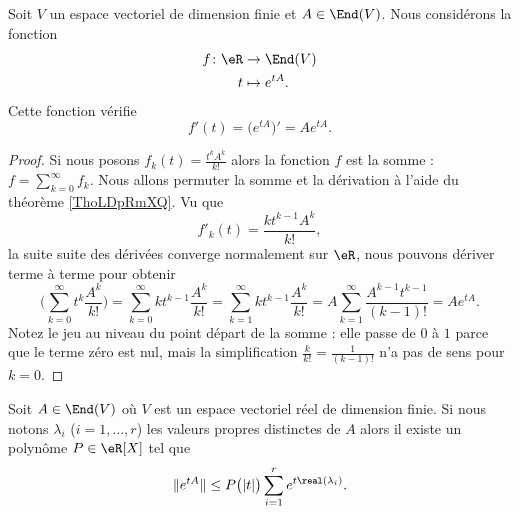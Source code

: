 \begin{proposition}
    Soit \( V\) un espace vectoriel de dimension finie et \( A\in\End(V)\). Nous considérons la fonction
    \begin{equation}
        \begin{aligned}
            f\colon \eR&\to \End(V) \\
            t&\mapsto  e^{tA}. 
        \end{aligned}
    \end{equation}
    Cette fonction vérifie
    \begin{equation}
        f'(t)=\big(  e^{tA} \big)'=A e^{tA}.
    \end{equation}
\end{proposition}

\begin{proof}
    Si nous posons \( f_k(t)=\frac{ t^kA^k }{ k! }\) alors la fonction \( f\) est la somme : \( f=\sum_{k=0}^{\infty}f_k\). Nous allons permuter la somme et la dérivation à l'aide du théorème \ref{ThoLDpRmXQ}. Vu que 
    \begin{equation}
        f'_k(t)=\frac{ kt^{k-1}A^k }{ k! },
    \end{equation}
    la suite suite des dérivées converge normalement sur \( \eR\), nous pouvons dériver terme à terme pour obtenir
    \begin{equation}
        \Big( \sum_{k=0}^{\infty}t^k\frac{ A^k }{ k! } \Big)=\sum_{k=0}^{\infty}kt^{k-1}\frac{ A^k }{ k! }=\sum_{k=1}^{\infty}kt^{k-1}\frac{ A^k }{ k! }=A\sum_{k=1}^{\infty}\frac{ A^{k-1}t^{k-1} }{ (k-1)! }=A e^{tA}.
    \end{equation}
    Notez le jeu au niveau du point départ de la somme : elle passe de \( 0\) à \( 1\) parce que le terme zéro est nul, mais la simplification \( \frac{ k }{ k! }=\frac{ 1 }{ (k-1)! }\) n'a pas de sens pour \( k=0\).
\end{proof}

\begin{lemma}   \label{LemQEARooLRXEef}
    Soit \( A\in\End(V)\) où \( V\) est un espace vectoriel réel de dimension finie. Si nous notons \( \lambda_i\) (\( i=1,\ldots, r\)) les valeurs propres distinctes de $A$ alors il existe un polynôme \( P\in \eR[X]\) tel que
    \begin{equation}
        \|  e^{tA} \|\leq P\big( | t | \big)\sum_{i=1}^r e^{t\real(\lambda_i)}.
    \end{equation}
\end{lemma}

